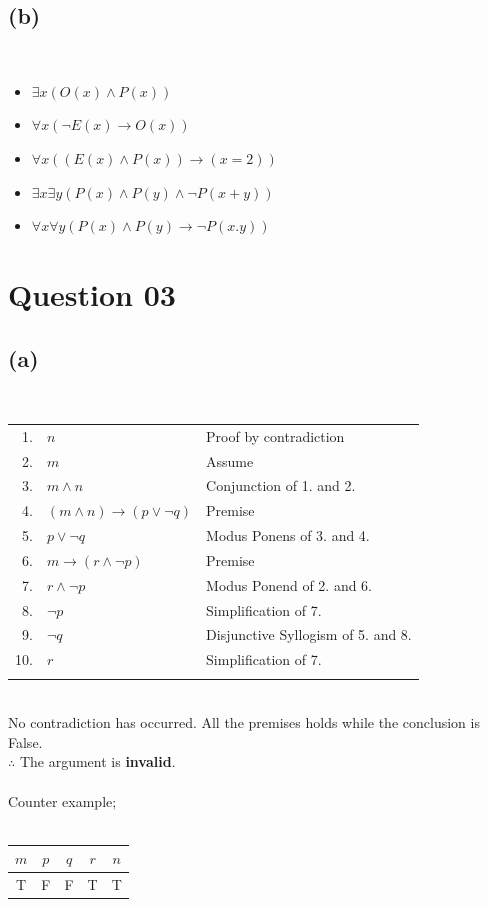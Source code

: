 \documentclass[a4paper,12pt]{article}
\begin{document}
\subsection{(b)}
\,
\begin{itemize}
    \item[( i )] $\exists x (O(x) \land P(x))$
    \item[( ii )] $\forall x (\neg E(x) \rightarrow O(x))$
    \item[( iii )] $\forall x ((E(x) \land P(x)) \rightarrow (x = 2))$
    \item[( iv )] $\exists x \exists y (P(x) \land P(y) \land \neg P(x + y))$
    \item[( v )] $\forall x \forall y (P(x) \land P(y) \rightarrow \neg P(x . y))$
\end{itemize}
\newpage

\section{Question 03}
\subsection{(a)}
\,\\
\begin{tabular}{rll}
     1. & $n$ & Proof by contradiction\\
     2. & $m$ & Assume\\
     3. & $m \land n$ & Conjunction of 1. and 2.\\
     4. & $(m \land n) \rightarrow (p \lor \neg q)$ & Premise\\
     5. & $p \lor \neg q$ & Modus Ponens of 3. and 4.\\
     6. & $m \rightarrow (r \land \neg p)$ & Premise\\
     7. & $r \land \neg p$ & Modus Ponend of 2. and 6.\\
     8. & $\neg p$ & Simplification of 7.\\
     9. & $\neg q$ & Disjunctive Syllogism of 5. and 8.\\
     10. & $r$ & Simplification of 7.\\\\
\end{tabular}
\,\\
No contradiction has occurred. All the premises holds while the conclusion is False.\\
$\therefore$ The argument is \textbf{invalid}.\\\\
Counter example;\\\\
\begin{tabular}{|c|c|c|c|c|}
\hline
$m$ & $p$ & $q$ & $r$ & $n$\\
\hline
T & F & F & T & T\\
\hline
\end{tabular}
\end{document}
